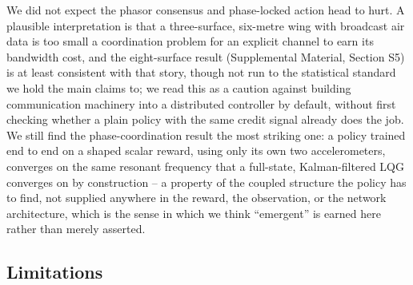 \documentclass[preprint,11pt]{elsarticle}
\begin{document}
We did not expect the phasor consensus and phase-locked action head to
hurt. A plausible interpretation is that a three-surface, six-metre wing
with broadcast air data is too small a coordination problem for an
explicit channel to earn its bandwidth cost, and the eight-surface result
(Supplemental Material, Section S5) is at least consistent with that
story, though not run to the statistical standard we hold the main claims
to; we read this as a caution against building communication machinery
into a distributed controller by default, without first checking whether a
plain policy with the same credit signal already does the job. We still
find the phase-coordination result the most striking one: a policy trained
end to end on a shaped scalar reward, using only its own two
accelerometers, converges on the same resonant frequency that a
full-state, Kalman-filtered LQG converges on by construction -- a property
of the coupled structure the policy has to find, not supplied anywhere in
the reward, the observation, or the network architecture, which is the
sense in which we think ``emergent'' is earned here rather than merely
asserted.

\subsection{Limitations}
\label{sec:limitations}
\end{document}
